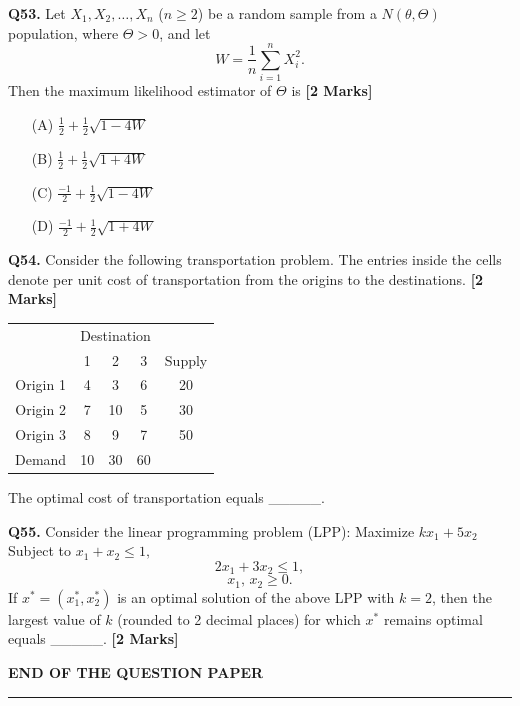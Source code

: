 \documentclass[11pt]{article}
\newcommand{\questionb}[2]{
    \noindent\textbf{Q#2.} #1 \hfill \textbf{[2 Marks]}
}
\begin{document}
\questionb{Let \( X_1, X_2, \ldots, X_n \) (\( n \geq 2 \)) be a random sample from a \( N(\theta, \Theta) \) population, where \( \Theta > 0 \), and let  
\[W = \frac{1}{n} \sum_{i=1}^n X_i^2.\]  
Then the maximum likelihood estimator of \( \Theta \) is}{53}
\begin{enumerate}
    \item[(A)] \(\frac{1}{2} + \frac{1}{2} \sqrt{1-4W}\)  
    \item[(B)] \(\frac{1}{2} + \frac{1}{2} \sqrt{1+4W}\)  
    \item[(C)] \(\frac{-1}{2} + \frac{1}{2} \sqrt{1-4W}\)  
    \item[(D)] \(\frac{-1}{2} + \frac{1}{2} \sqrt{1+4W}\)  
\end{enumerate}
\vspace{0.5cm}

\questionb{Consider the following transportation problem. The entries inside the cells denote per unit cost of transportation from the origins to the destinations.}{54}
\begin{center}
\begin{tabular}{|c|ccc|c|}
\hline
 & \multicolumn{3}{c|}{Destination} & \\
 & 1 & 2 & 3 & Supply \\
\hline
Origin 1 & 4 & 3 & 6 & 20 \\
Origin 2 & 7 & 10 & 5 & 30 \\
Origin 3 & 8 & 9 & 7 & 50 \\
\hline
Demand & 10 & 30 & 60 & \\
\hline
\end{tabular}
\end{center}
The optimal cost of transportation equals \_\_\_\_\_. 
\vspace{0.5cm}

\questionb{Consider the linear programming problem (LPP):
Maximize \( k x_1 + 5 x_2 \)
Subject to \( x_1 + x_2 \leq 1, \)
\[ 2 x_1 + 3 x_2 \leq 1, \]
\[ x_1, \, x_2 \geq 0. \]
If \( x^* = (x_1^*, x_2^*) \) is an optimal solution of the above LPP with \( k = 2 \), then the largest value of \( k \) (rounded to 2 decimal places) for which \( x^* \) remains optimal equals \_\_\_\_\_.}{55}
\vspace{0.5cm}

\begin{center}
\textbf{END OF THE QUESTION PAPER}
\rule{\textwidth}{0.5pt} 
\end{center}
\end{document}
